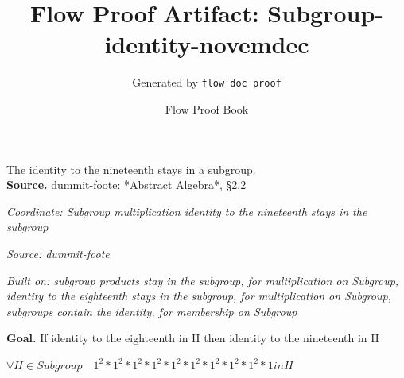 \documentclass[11pt]{article}
\title{Flow Proof Artifact: Subgroup-identity-novemdec}
\author{Generated by \texttt{flow doc proof}}
\date{Flow Proof Book}
\theoremstyle{definition}
\begin{document}
\maketitle
The identity to the nineteenth stays in a subgroup.\\[0.5em]
\textbf{Source.} dummit-foote: *Abstract Algebra*, §2.2\\[0.5em]
\bigskip
{}\par
\smallskip\noindent\textit{Coordinate: Subgroup \cdot multiplication \cdot identity to the nineteenth stays in the subgroup}\par
\smallskip\noindent\textit{Source: dummit-foote}\par
\smallskip\noindent\textit{Built on: subgroup products stay in the subgroup, for multiplication on Subgroup, identity to the eighteenth stays in the subgroup, for multiplication on Subgroup, subgroups contain the identity, for membership on Subgroup}\par
\medskip
\noindent\textbf{Goal.} If identity to the eighteenth in H then identity to the nineteenth in H\par
\noindent$\displaystyle \forall H \in Subgroup\quad 1^{2} * 1^{2} * 1^{2} * 1^{2} * 1^{2} * 1^{2} * 1^{2} * 1^{2} * 1^{2} * 1 in H$\par
\medskip
\noindent
\end{document}
